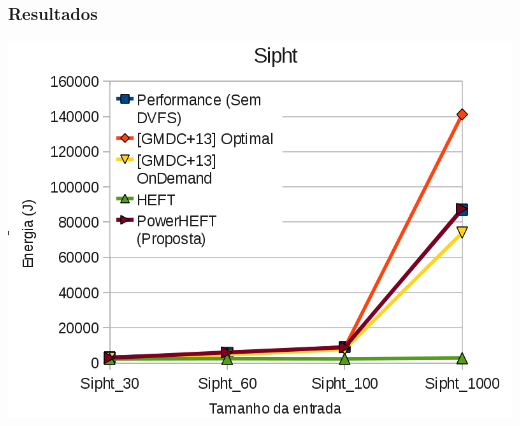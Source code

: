 \documentclass{beamer}
\begin{document}
\begin{frame}
\frametitle{Resultados}
	\begin{center}
		\includegraphics[width=0.9\columnwidth]{Sipht.png}
	\end{center}
\end{frame}
\end{document}
